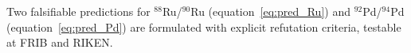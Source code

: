 \documentclass[11pt,a4paper]{article}
\theoremstyle{definition}
\begin{document}
Two falsifiable predictions for $^{88}$Ru/$^{90}$Ru
(equation~\eqref{eq:pred_Ru}) and $^{92}$Pd/$^{94}$Pd
(equation~\eqref{eq:pred_Pd}) are formulated with explicit refutation criteria,
testable at FRIB and RIKEN.



\end{document}
